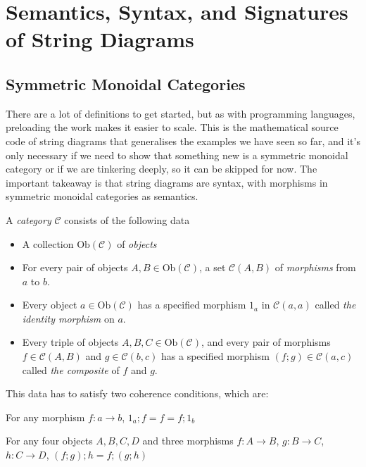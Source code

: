 \section{Semantics, Syntax, and Signatures of String Diagrams}

\subsection{Symmetric Monoidal Categories}

There are a lot of definitions to get started, but as with programming languages, preloading the work makes it easier to scale. This is the mathematical source code of string diagrams that generalises the examples we have seen so far, and it's only necessary if we need to show that something new is a symmetric monoidal category or if we are tinkering deeply, so it can be skipped for now. The important takeaway is that string diagrams are syntax, with morphisms in symmetric monoidal categories as semantics.

\begin{defn}[Category]
A \emph{category} $\mathcal{C}$ consists of the following data
\begin{itemize}
\item{A collection $\text{Ob}(\mathcal{C})$ of \emph{objects}}
\item{For every pair of objects $A,B \in \text{Ob}(\mathcal{C})$, a set $\mathcal{C}(A,B)$ of \emph{morphisms} from $a$ to $b$.}
\item{Every object $a \in \text{Ob}(\mathcal{C})$ has a specified morphism $1_a$ in $\mathcal{C}(a,a)$ called \emph{the identity morphism} on $a$.}
\item{Every triple of objects $A,B,C \in \text{Ob}(\mathcal{C})$, and every pair of morphisms $f \in \mathcal{C}(A,B)$ and $g \in \mathcal{C}(b,c)$ has a specified morphism $(f;g) \in \mathcal{C}(a,c)$ called \emph{the composite} of $f$ and $g$.}
\end{itemize}
This data has to satisfy two coherence conditions, which are:

 For any morphism $f: a \rightarrow b$, $1_a;f = f = f;1_b$

 For any four objects $A,B,C,D$ and three morphisms $f: A \rightarrow B$, $g: B \rightarrow C$, $h: C \rightarrow D$, $(f;g);h = f;(g;h)$
\end{defn}

